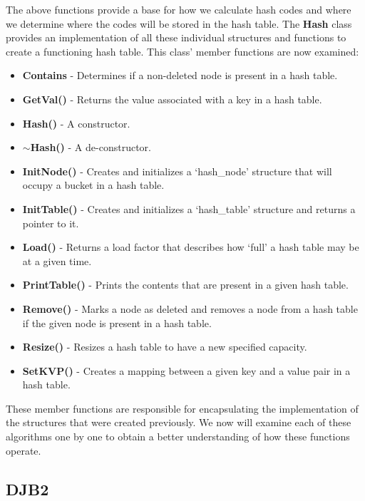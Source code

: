 \noindent The above functions provide a base for how we calculate hash codes and where we determine where the codes will be stored in the hash table. The \textbf{Hash} class provides an implementation of all
these individual structures and functions to create a functioning hash table. This class' member functions are now examined:

\begin{itemize}
    \item \textbf{Contains} - Determines if a non-deleted node is present in a hash table.
    \item \textbf{GetVal()} - Returns the value associated with a key in a hash table.
    \item \textbf{Hash()} - A constructor.
    \item \textbf{$\sim$Hash()} - A de-constructor.
    \item \textbf{InitNode()} - Creates and initializes a `hash\_node' structure that will occupy a bucket in a hash table.
    \item \textbf{InitTable()} - Creates and initializes a `hash\_table' structure and returns a pointer to it.
    \item \textbf{Load()} - Returns a load factor that describes how `full' a hash table may be at a given time.
    \item \textbf{PrintTable()} - Prints the contents that are present in a given hash table.
    \item \textbf{Remove()} - Marks a node as deleted and removes a node from a hash table if the given node is present in a hash table.
    \item \textbf{Resize()} - Resizes a hash table to have a new specified capacity.
    \item \textbf{SetKVP()} - Creates a mapping between a given key and a value pair in a hash table. 
\end{itemize}

\noindent These member functions are responsible for encapsulating the implementation of the structures that were created previously. We now will examine each of these algorithms one by one to obtain a better 
understanding of how these functions operate.

\subsection*{DJB2}

